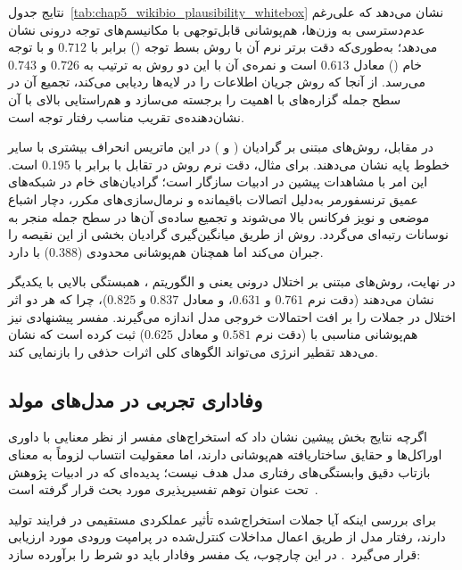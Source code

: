 نتایج جدول~\ref{tab:chap5_wikibio_plausibility_whitebox} نشان می‌دهد که  علی‌رغم عدم‌دسترسی به وزن‌ها، هم‌پوشانی قابل‌توجهی با مکانیسم‌های توجه درونی نشان می‌دهد؛ به‌طوری‌که دقت برتر نرم آن با روش بسط توجه () برابر با $0.712$ و با توجه خام () معادل $0.613$ است و نمره‌ی  آن با این دو روش به ترتیب به $0.726$ و $0.743$ می‌رسد. از آنجا که روش  جریان اطلاعات را در لایه‌ها ردیابی می‌کند، تجمیع آن در سطح جمله گزاره‌های با اهمیت را برجسته می‌سازد و هم‌راستایی بالای  با آن نشان‌دهنده‌ی تقریب مناسب رفتار توجه است.

در مقابل، روش‌های مبتنی بر گرادیان ( و ) در این ماتریس انحراف بیشتری با سایر خطوط پایه نشان می‌دهند. برای مثال، دقت نرم روش  در تقابل با  برابر با $0.195$ است. این امر با مشاهدات پیشین در ادبیات سازگار است؛ گرادیان‌های خام در شبکه‌های عمیق ترنسفورمر به‌دلیل اتصالات باقیمانده و نرمال‌سازی‌های مکرر، دچار اشباع موضعی و نویز فرکانس بالا می‌شوند و تجمیع ساده‌ی آن‌ها در سطح جمله منجر به نوسانات رتبه‌ای می‌گردد. روش  از طریق میانگین‌گیری گرادیان بخشی از این نقیصه را جبران می‌کند اما همچنان هم‌پوشانی محدودی ($0.388$) با  دارد.

در نهایت، روش‌های مبتنی بر اختلال درونی یعنی  و الگوریتم ، همبستگی بالایی با یکدیگر نشان می‌دهند (دقت نرم $0.761$ و $0.631$، و  معادل $0.837$ و $0.825$)، چرا که هر دو اثر اختلال در جملات را بر افت احتمالات خروجی مدل اندازه می‌گیرند. مفسر پیشنهادی  نیز هم‌پوشانی مناسبی با  (دقت نرم $0.581$ و  معادل $0.625$) ثبت کرده است که نشان می‌دهد تقطیر انرژی می‌تواند الگوهای کلی اثرات حذفی را بازنمایی کند.


\subsection{وفاداری تجربی در مدل‌های مولد}\label{sec:5-3-2}

اگرچه نتایج بخش پیشین نشان داد که استخراج‌های مفسر  از نظر معنایی با داوری اوراکل‌ها و حقایق ساختاریافته هم‌پوشانی دارند، اما معقولیت انتساب لزوماً به معنای بازتاب دقیق وابستگی‌های رفتاری مدل هدف نیست؛ پدیده‌ای که در ادبیات پژوهش تحت عنوان توهم تفسیرپذیری مورد بحث قرار گرفته است~\cite{friedman2024interpretability}. 

برای بررسی اینکه آیا جملات استخراج‌شده تأثیر عملکردی مستقیمی در فرایند تولید دارند، رفتار مدل از طریق اعمال مداخلات کنترل‌شده در پرامپت ورودی مورد ارزیابی قرار می‌گیرد~\cite{atanasova2023faithfulness}. در این چارچوب، یک مفسر وفادار باید دو شرط را برآورده سازد:

